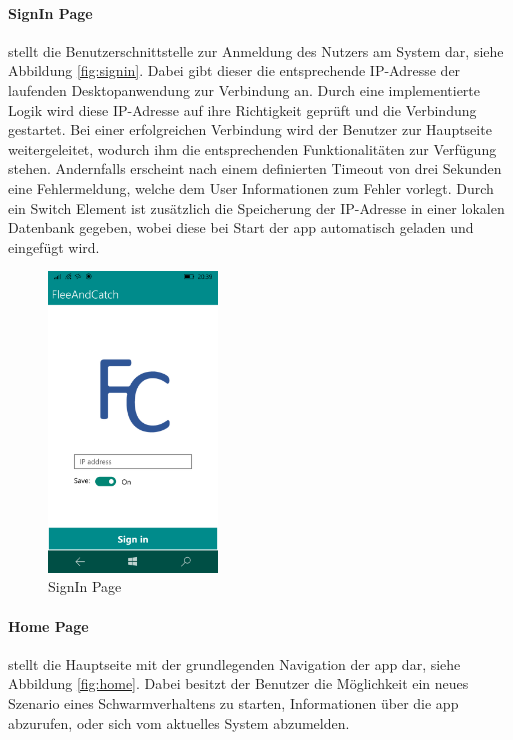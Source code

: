 \paragraph{SignIn Page} stellt die Benutzerschnittstelle zur Anmeldung des Nutzers am System dar, siehe Abbildung \eqref{fig:signin}. Dabei gibt dieser die entsprechende IP-Adresse der laufenden Desktopanwendung zur Verbindung an. Durch eine implementierte Logik wird diese IP-Adresse auf ihre Richtigkeit geprüft und die Verbindung gestartet. Bei einer erfolgreichen Verbindung wird der Benutzer zur Hauptseite weitergeleitet, wodurch ihm die entsprechenden Funktionalitäten zur Verfügung stehen. Andernfalls erscheint nach einem definierten Timeout von drei Sekunden eine Fehlermeldung, welche dem User Informationen zum Fehler vorlegt. Durch ein Switch Element ist zusätzlich die Speicherung der IP-Adresse in einer lokalen Datenbank gegeben, wobei diese bei Start der \gls{app} automatisch geladen und eingefügt wird.\\

\begin{figure}[h]
	\begin{center}
		\includegraphics[width=0.4\textwidth]{images/implementation/signin.png}
	\end{center}	
	\caption{SignIn Page}
	\label{fig:signin}
\end{figure}

\newpage
\paragraph{Home Page} stellt die Hauptseite mit der grundlegenden Navigation der \gls{app} dar, siehe Abbildung \eqref{fig:home}. Dabei besitzt der Benutzer die Möglichkeit ein neues Szenario eines Schwarmverhaltens zu starten, Informationen über die \gls{app} abzurufen, oder sich vom aktuelles System abzumelden.

